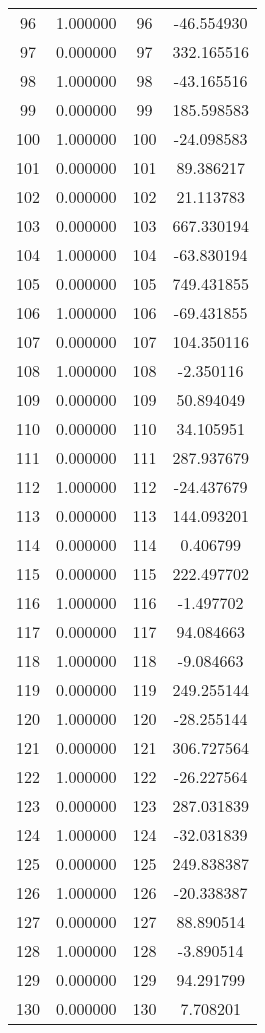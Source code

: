 \documentclass[12pt]{article}
\begin{document}
\begin{longtable}{@{}cccc@{}}
96 & 1.000000 & 96 & -46.554930 \\
97 & 0.000000 & 97 & 332.165516 \\
98 & 1.000000 & 98 & -43.165516 \\
99 & 0.000000 & 99 & 185.598583 \\
100 & 1.000000 & 100 & -24.098583 \\
101 & 0.000000 & 101 & 89.386217 \\
102 & 0.000000 & 102 & 21.113783 \\
103 & 0.000000 & 103 & 667.330194 \\
104 & 1.000000 & 104 & -63.830194 \\
105 & 0.000000 & 105 & 749.431855 \\
106 & 1.000000 & 106 & -69.431855 \\
107 & 0.000000 & 107 & 104.350116 \\
108 & 1.000000 & 108 & -2.350116 \\
109 & 0.000000 & 109 & 50.894049 \\
110 & 0.000000 & 110 & 34.105951 \\
111 & 0.000000 & 111 & 287.937679 \\
112 & 1.000000 & 112 & -24.437679 \\
113 & 0.000000 & 113 & 144.093201 \\
114 & 0.000000 & 114 & 0.406799 \\
115 & 0.000000 & 115 & 222.497702 \\
116 & 1.000000 & 116 & -1.497702 \\
117 & 0.000000 & 117 & 94.084663 \\
118 & 1.000000 & 118 & -9.084663 \\
119 & 0.000000 & 119 & 249.255144 \\
120 & 1.000000 & 120 & -28.255144 \\
121 & 0.000000 & 121 & 306.727564 \\
122 & 1.000000 & 122 & -26.227564 \\
123 & 0.000000 & 123 & 287.031839 \\
124 & 1.000000 & 124 & -32.031839 \\
125 & 0.000000 & 125 & 249.838387 \\
126 & 1.000000 & 126 & -20.338387 \\
127 & 0.000000 & 127 & 88.890514 \\
128 & 1.000000 & 128 & -3.890514 \\
129 & 0.000000 & 129 & 94.291799 \\
130 & 0.000000 & 130 & 7.708201 \\

\end{longtable}
\end{document}
